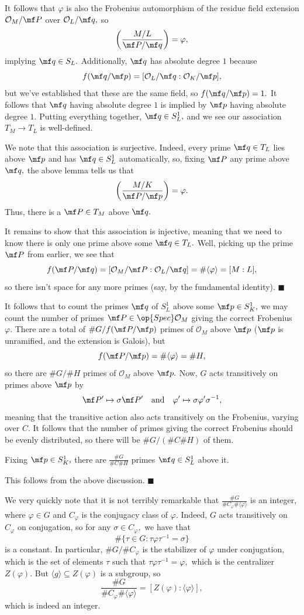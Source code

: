 It follows that $\varphi$ is also the Frobenius automorphism of the residue field extension $\mathcal O_M/\mf P$ over $\mathcal O_L/\mf q,$ so
\[\left(\frac{M/L}{\mf P/\mf q}\right)=\varphi,\]
implying $\mf q\in S_L.$ Additionally, $\mf q$ has absolute degree $1$ because
\[f(\mf q/\mf p)=[\mathcal O_L/\mf q:\mathcal O_K/\mf p],\]
but we've established that these are the same field, so $f(\mf q/\mf p)=1.$ It follows that $\mf q$ having absolute degree $1$ is implied by $\mf p$ having absolute degree $1.$ Putting everything together, $\mf q\in S^1_L,$ and we see our association $T_M\to T_L$ is well-defined.

We note that this association is surjective. Indeed, every prime $\mf q\in T_L$ lies above $\mf p$ and has $\mf q\in S^1_L$ automatically, so, fixing $\mf P$ any prime above $\mf q,$ the above lemma tells us that
\[\left(\frac{M/K}{\mf P/\mf p}\right)=\varphi.\]
Thus, there is a $\mf P\in T_M$ above $\mf q.$

It remains to show that this association is injective, meaning that we need to know there is only one prime above some $\mf q\in T_L.$ Well, picking up the prime $\mf P$ from earlier, we see that
\[f(\mf P/\mf q)=[\mathcal O_M/\mf P:\mathcal O_L/\mf q]=\#\langle\varphi\rangle=[M:L],\]
so there isn't space for any more primes (say, by the fundamental identity). $\blacksquare$

It follows that to count the primes $\mf q$ of $S^1_L$ above some $\mf p\in S^1_K,$ we may count the number of primes $\mf P\in\op{Spec}\mathcal O_M$ giving the correct Frobenius $\varphi.$ There are a total of $\#G/f(\mf P/\mf p)$ primes of $\mathcal O_M$ above $\mf p$ ($\mf p$ is unramified, and the extension is Galois), but
\[f(\mf P/\mf p)=\#\langle\varphi\rangle=\#H,\]
so there are $\#G/\#H$ primes of $\mathcal O_M$ above $\mf p.$ Now, $G$ acts transitively on primes above $\mf p$ by
\[\mf P'\mapsto\sigma\mf P'\quad\text{and}\quad\varphi'\mapsto\sigma\varphi'\sigma^{-1},\]
meaning that the transitive action also acts transitively on the Frobenius, varying over $C.$ It follows that the number of primes giving the correct Frobenius should be evenly distributed, so there will be $\#G/(\#C\#H)$ of them.
\begin{lemma}
    Fixing $\mf p\in S^1_K,$ there are $\frac{\#G}{\#C\#H}$ primes $\mf q\in S^1_L$ above it.
\end{lemma}
This follows from the above discussion. $\blacksquare$

We very quickly note that it is not terribly remarkable that $\frac{\#G}{\#C_\varphi\#\langle \varphi\rangle}$ is an integer, where $\varphi\in G$ and $C_\varphi$ is the conjugacy class of $\varphi.$ Indeed, $G$ acts transitively on $C_\varphi$ on conjugation, so for any $\sigma\in C_\varphi,$ we have that
\[\#\{\tau\in G:\tau\varphi\tau^{-1}=\sigma\}\]
is a constant. In particular, $\#G/\#C_\varphi$ is the stabilizer of $\varphi$ under conjugation, which is the set of elements $\tau$ such that $\tau\varphi\tau^{-1}=\varphi,$ which is the centralizer $Z(\varphi).$ But $\langle g\rangle\subseteq Z(\varphi)$ is a subgroup, so
\[\frac{\#G}{\#C_\varphi\#\langle\varphi\rangle}=[Z(\varphi):\langle\varphi\rangle],\]
which is indeed an integer.

